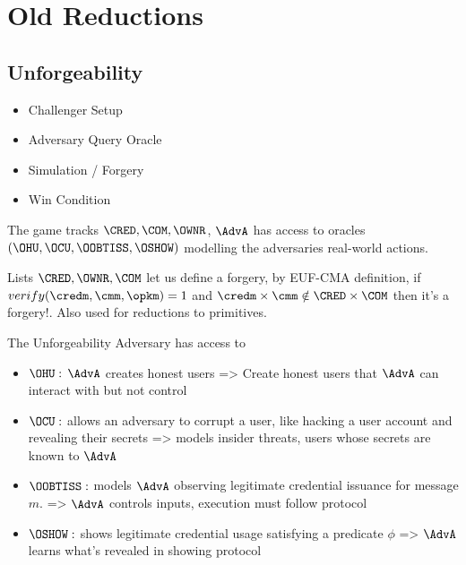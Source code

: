 





































\section{Old Reductions}
\subsection{Unforgeability}
\begin{itemize}
    \item Challenger Setup
    \item Adversary Query Oracle
    \item Simulation / Forgery
    \item Win Condition
\end{itemize}
The game tracks $\CRED, \COM, \OWNR$, $\AdvA$ has access to oracles $(\OHU, \OCU, \OOBTISS, \OSHOW)$ modelling the adversaries real-world actions. 

Lists $\CRED, \OWNR, \COM$ let us define a forgery, by EUF-CMA definition, if $verify(\credm, \cmm, \opkm) = 1$ and $\credm \times \cmm \notin \CRED \times \COM$ then it's a forgery!. Also used for reductions to primitives.

The Unforgeability Adversary has access to 
\begin{itemize}
    \item $\OHU:$ $\AdvA$ creates honest users => Create honest users that $\AdvA$ can interact with but not control
    \item $\OCU:$ allows an adversary to corrupt a user, like hacking a user account and revealing their secrets => models insider threats, users whose secrets are known to $\AdvA$
    \item $\OOBTISS:$ models $\AdvA$ observing legitimate credential issuance for message $m$. => $\AdvA$ controls inputs, execution must follow protocol
    \item $\OSHOW:$ shows legitimate credential usage satisfying a predicate $\phi$ => $\AdvA$ learns what's revealed in showing protocol
\end{itemize}


